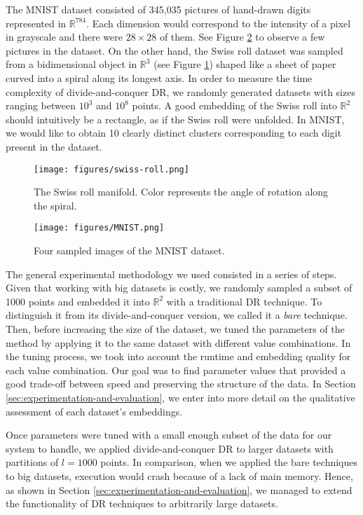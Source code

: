 The MNIST dataset consisted of 345,035 pictures of hand-drawn digits represented in $\mathbb{R}^{784}$. Each dimension would correspond to the intensity of a pixel in grayscale and there were $28 \times 28$ of them. See Figure \ref{fig:MNIST} to observe a few pictures in the dataset. On the other hand, the Swiss roll dataset was sampled from a bidimensional object in $\mathbb{R}^3$ (see Figure \ref{fig:swiss-roll}) shaped like a sheet of paper curved into a spiral along its longest axis. In order to measure the time complexity of divide-and-conquer DR, we randomly generated datasets with sizes ranging between $10^3$ and $10^8$ points. A good embedding of the Swiss roll into $\mathbb{R}^2$ should intuitively be a rectangle, as if the Swiss roll were unfolded. In MNIST, we would like to obtain 10 clearly distinct clusters corresponding to each digit present in the dataset.

\begin{figure}
    \centering
    \texttt{[image: figures/swiss-roll.png]}
    \caption{The Swiss roll manifold. Color represents the angle of rotation along the spiral.}
    \label{fig:swiss-roll}
\end{figure}

\begin{figure}
    \centering
    \texttt{[image: figures/MNIST.png]}
    \caption{Four sampled images of the MNIST dataset.}
    \label{fig:MNIST}
\end{figure}

The general experimental methodology we used consisted in a series of steps. Given that working with big datasets is costly, we randomly sampled a subset of 1000 points and embedded it into $\mathbb{R}^2$ with a traditional DR technique. To distinguish it from its divide-and-conquer version, we called it a \textit{bare} technique. Then, before increasing the size of the dataset, we tuned the parameters of the method by applying it to the same dataset with different value combinations. In the tuning process, we took into account the runtime and embedding quality for each value combination. Our goal was to find parameter values that provided a good trade-off between speed and preserving the structure of the data. In Section \ref{sec:experimentation-and-evaluation}, we enter into more detail on the qualitative assessment of each dataset's embeddings.

Once parameters were tuned with a small enough subset of the data for our system to handle, we applied divide-and-conquer DR to larger datasets with partitions of $l=1000$ points. In comparison, when we applied the bare techniques to big datasets, execution would crash because of a lack of main memory. Hence, as shown in Section \ref{sec:experimentation-and-evaluation}, we managed to extend the functionality of DR techniques to arbitrarily large datasets.